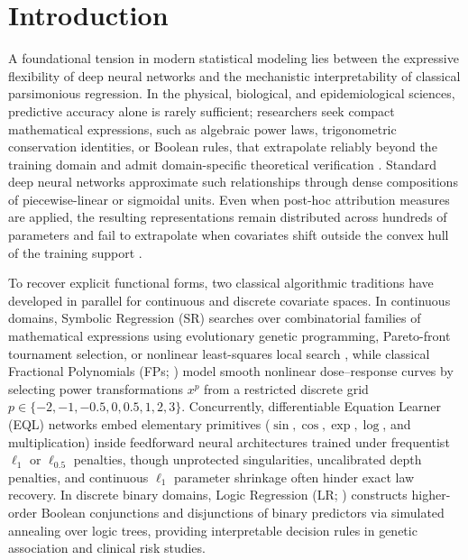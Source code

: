 \documentclass[11pt,a4paper]{article}
\begin{document}
\section{Introduction}
\label{sec:intro}

A foundational tension in modern statistical modeling lies between the expressive flexibility of deep neural networks and the mechanistic interpretability of classical parsimonious regression. In the physical, biological, and epidemiological sciences, predictive accuracy alone is rarely sufficient; researchers seek compact mathematical expressions, such as algebraic power laws, trigonometric conservation identities, or Boolean rules, that extrapolate reliably beyond the training domain and admit domain-specific theoretical verification \citep{udrescu2020ai, la2021contemporary}. Standard deep neural networks approximate such relationships through dense compositions of piecewise-linear or sigmoidal units. Even when post-hoc attribution measures are applied, the resulting representations remain distributed across hundreds of parameters and fail to extrapolate when covariates shift outside the convex hull of the training support \citep{rudin2019stop}.

To recover explicit functional forms, two classical algorithmic traditions have developed in parallel for continuous and discrete covariate spaces. In continuous domains, Symbolic Regression (SR) searches over combinatorial families of mathematical expressions using evolutionary genetic programming, Pareto-front tournament selection, or nonlinear least-squares local search \citep{koza1992genetic, burlacu2020operon, la2021contemporary, cranmer2023interpretable}, while classical Fractional Polynomials (FPs; \citealp{royston1994regression}) model smooth nonlinear dose--response curves by selecting power transformations $x^p$ from a restricted discrete grid $p \in \{-2, -1, -0.5, 0, 0.5, 1, 2, 3\}$. Concurrently, differentiable Equation Learner (EQL) networks \citep{martius2016extrapolation, sahoo2018learning, kim2020integration} embed elementary primitives ($\sin, \cos, \exp, \log$, and multiplication) inside feedforward neural architectures trained under frequentist $\ell_1$ or $\ell_{0.5}$ penalties, though unprotected singularities, uncalibrated depth penalties, and continuous $\ell_1$ parameter shrinkage often hinder exact law recovery. In discrete binary domains, Logic Regression (LR; \citealp{ruczinski2003logic}) constructs higher-order Boolean conjunctions and disjunctions of binary predictors via simulated annealing over logic trees, providing interpretable decision rules in genetic association and clinical risk studies.
\end{document}
